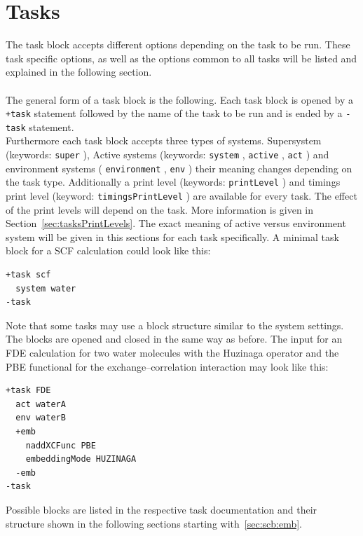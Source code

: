 \documentclass[bibliography=totocnumbered,a4paper,10pt,oneside]{scrbook}
\newcommand{\ttt}[1]{%
  \begingroup\setlength{\fboxsep}{1pt}%
  \colorbox{serenity-green!30}{\texttt{\hspace*{2pt}\vphantom{(g}#1\hspace*{2pt}}}%
  \endgroup
}
\begin{document}
\clearpage
\section{Tasks}
\label{sec:tasks}
The task block accepts different options depending on the task to be run.
These task specific options, as well as the options common to all tasks will be listed and explained
in the following section.\\
\\
The general form of a task block is the following.
Each task block is opened by a \ttt{+task} statement followed by the name of the
task to be run and is ended by a \ttt{-task} statement.\\
Furthermore each task block accepts three types of systems. Supersystem (keywords: \ttt{super}),
Active  systems (keywords: \ttt{system}, \ttt{active}, \ttt{act}) and environment systems
(\ttt{environment}, \ttt{env}) their meaning changes depending
on the task type. Additionally a print level (keywords: \ttt{printLevel}) and timings
print level (keyword: \ttt{timingsPrintLevel}) are available
for every task. The effect of the print levels will depend on the task. More information
is given in Section~\ref{sec:tasksPrintLevels}.
The exact meaning of active versus environment system will be given in this sections
for each task specifically.
A minimal task block for a SCF calculation could look like this:
\begin{lstlisting}
+task scf
  system water
-task
\end{lstlisting}
Note that some tasks may use a block structure similar to the system settings.
The blocks are opened and closed in the same way as before. The input for an
FDE calculation for two water molecules with the Huzinaga operator and the
PBE functional for the exchange--correlation interaction may look like this:
\begin{lstlisting}
+task FDE
  act waterA
  env waterB
  +emb
    naddXCFunc PBE
    embeddingMode HUZINAGA
  -emb
-task
\end{lstlisting}
Possible blocks are listed in the respective task documentation and their
structure shown in the following sections starting with~\ref{sec:scb:emb}.
\end{document}
